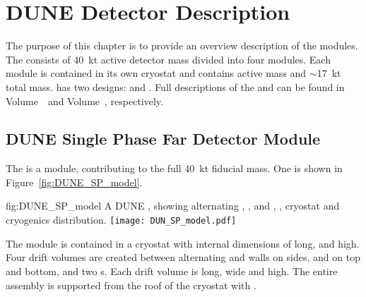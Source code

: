 \chapter{DUNE Detector Description}
\label{vl:tc-dune_overview}


The purpose of this chapter is to provide an overview description of the    modules. The  consists of \SI{40}{\kilo\tonne} active
detector mass divided into four modules. Each module is contained in
its own cryostat and contains \nominalmodsize active mass and
$\sim$\SI{17}{\kilo\tonne} total mass.  has two designs:
 and . %
Full
descriptions of the  and   can be found
in   Volume~\volnumbersp\ and  Volume~\volnumberdp{}, respectively.

\section{DUNE Single Phase Far Detector Module}
\label{sec:fdsp-SP-module}

The   is a \nominalmodsize module,
contributing to the full \SI{40}{\kilo\tonne}  fiducial
mass.  One \nominalmodsize {} is shown in
Figure~\ref{fig:DUNE_SP_model}.

\begin{dunefigure}
{fig:DUNE_SP_model} 
{A \nominalmodsize DUNE 
    , showing alternating ,
    ,  and , , cryostat
    and cryogenics distribution.}
  \texttt{[image: DUN\_SP\_model.pdf]}
\end{dunefigure} 

The module is contained in a cryostat with
internal dimensions of \cryostatlen %
long, \cryostatwdth %
and \cryostatht %
high.  Four drift volumes are created between
alternating  and  walls on sides,  and
 on top and bottom, and two \endwall{}s.  Each drift volume
is \sptpclen %
long, \spmaxdrift %
wide and
\tpcheight %
high.  The entire assembly is supported from the
roof of the cryostat with .

